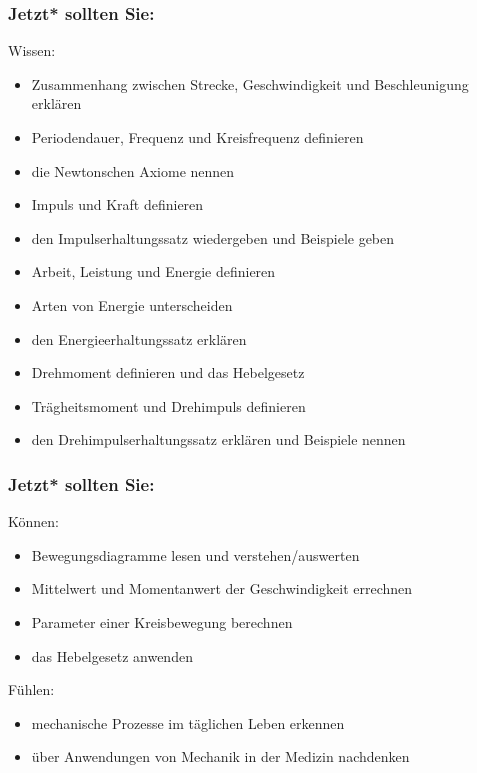 \documentclass{beamer}
\begin{document}

\begin{frame}

\frametitle{Jetzt* sollten Sie:}



\begin{block}{Wissen:}
\begin{itemize}
\item
Zusammenhang zwischen Strecke, Geschwindigkeit und Beschleunigung erklären
\item
Periodendauer, Frequenz und Kreisfrequenz definieren
\item
die Newtonschen Axiome nennen
\item
Impuls und Kraft definieren
\item
den  Impulserhaltungssatz wiedergeben und Beispiele geben
\item
Arbeit, Leistung und Energie definieren
\item
Arten von Energie unterscheiden
\item
den Energieerhaltungssatz erklären
\item
Drehmoment definieren und das Hebelgesetz
\item
Trägheitsmoment und Drehimpuls definieren
\item
den Drehimpulserhaltungssatz erklären und Beispiele nennen 
\end{itemize}

\end{block}

\end{frame}

\begin{frame}

\frametitle{Jetzt* sollten Sie:}
 



\begin{block}{Können:}
\begin{itemize}
\item
Bewegungsdiagramme lesen und verstehen/auswerten
\item
Mittelwert und Momentanwert der Geschwindigkeit errechnen
\item
Parameter einer Kreisbewegung berechnen
\item 
das Hebelgesetz anwenden
\end{itemize}
\end{block}


 
\begin{block}{Fühlen:}
\begin{itemize}
\item
mechanische Prozesse im täglichen Leben erkennen
\item
über Anwendungen von Mechanik in der Medizin nachdenken
\end{itemize}
\end{block}

 \end{frame}
\end{document}

